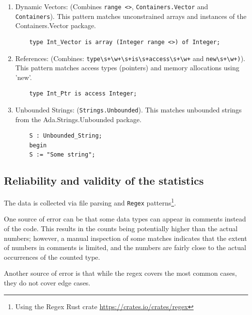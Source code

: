 \documentclass[nomenclature, english, bibtex]{kththesis}
\newcommand{\inlinecode}[1]{\texttt{#1}}
\begin{document}
\begin{enumerate}
    \item Dynamic Vectors: (Combines \verb|range <>|, \verb|Containers.Vector| and \verb|Containers|).
This pattern matches unconstrained arrays and instances of the Containers.Vector package.

    \begin{verbatim}
    type Int_Vector is array (Integer range <>) of Integer;
    \end{verbatim}

    \item References: (Combines: \verb|type\s+\w+\s+is\s+access\s+\w+| and \verb|new\s+\w+)|). This pattern matches access types (pointers) and memory allocations using 'new'.

    \begin{verbatim}
    type Int_Ptr is access Integer;
    \end{verbatim}

    \item Unbounded Strings: (\verb|Strings.Unbounded|). This matches unbounded strings from the Ada.Strings.Unbounded package.

    \begin{verbatim}
    S : Unbounded_String;
    begin
    S := "Some string";
    \end{verbatim}
\end{enumerate}

 

\subsection{Reliability and validity of the statistics}

The data is collected via file parsing and \texttt{Regex} patterns\footnote{Using the Regex Rust crate \href{(documentation)}{https://crates.io/crates/regex}}. 

One source of error can be that some data types can appear in comments instead of the code. This results in the counts being potentially higher than the actual numbers; however, a manual inspection of some matches indicates that the extent of numbers in comments is limited, and the numbers are fairly close to the actual occurrences of the counted type.


Another source of error is that while the regex covers the most common cases, they do not cover edge cases.
\end{document}
